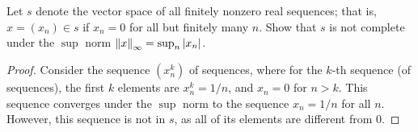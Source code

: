 \begin{exercise}{33}
Let $s$ denote the vector space of all finitely nonzero real sequences;
that is, $x=(x_n)\in s$ if $x_n=0$ for all but finitely many $n$.
Show that $s$ is not complete under the $\sup$ norm $\left\lVert x\right\rVert_\infty=\sup_n\left\lvert x_n\right\rvert$.
\end{exercise}
\begin{proof}
Consider the sequence $(x^k_n)$ of sequences, where for the $k$-th sequence (of sequences), the first $k$ elements are $x_n^k=1/n$, and $x_n=0$ for $n>k$.
This sequence converges under the $\sup$ norm to the sequence $x_n=1/n$ for all $n$.
However, this sequence is not in $s$, as all of its elements are different from 0.
\end{proof} 
